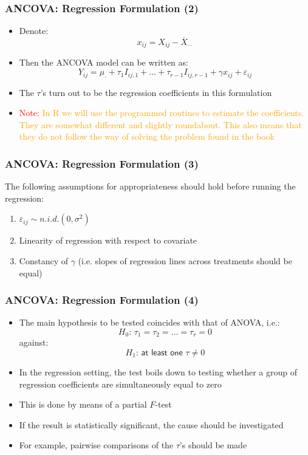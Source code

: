 \documentclass[10pt]{beamer}
\theoremstyle{definition}
\begin{document}
\begin{frame}[fragile]
\frametitle{ANCOVA: Regression Formulation (2)}
\begin{itemize}
	\item Denote:
	\[
		x_{ij} = X_{ij} - \overline{X}_{\cdot\cdot}
	\]
	\item Then the ANCOVA model can be written as:
	\[
		Y_{ij} = \mu_{\cdot} + \tau_{1}I_{ij,1} + \ldots + \tau_{r-1}I_{ij,r-1} + \gamma x_{ij} + \varepsilon_{ij}
	\]
	\item The $\tau$'s turn out to be the regression coefficients in this formulation
	\item \textcolor{red}{Note:} \textcolor{orange}{In R we will use the programmed routines to estimate the coefficients. They are somewhat different and slightly roundabout. This also means that they do not follow the way of solving the problem found in the book}
\end{itemize}
\end{frame}

\begin{frame}[fragile]
\frametitle{ANCOVA: Regression Formulation (3)}
The following assumptions for appropriateness should hold before running the regression:
\begin{enumerate}
	\item $\varepsilon_{ij} \sim n.i.d.(0,\sigma^{2})$
	\item Linearity of regression with respect to covariate
	\item Constancy of $\gamma$ (i.e. slopes of regression lines across treatments should be equal)
\end{enumerate}
\end{frame}

\begin{frame}[fragile]
\frametitle{ANCOVA: Regression Formulation (4)}
\begin{itemize}
	\item The main hypothesis to be tested coincides with that of ANOVA, i.e.:
	\[
			H_{0}:\, \tau_{1} = \tau_{2} = \ldots = \tau_{r} = 0
	\]
	against:
	\[
		H_{1}:\, \textsf{at least one } \tau \neq 0
	\]
	\item In the regression setting, the test boils down to testing whether a group of regression coefficients are simultaneously equal to zero
	\item This is done by means of a partial $F$-test
	\item If the result is statistically significant, the cause should be investigated
	\item For example, pairwise comparisons of the $\tau$'s should be made
\end{itemize}
\end{frame}
\end{document}

